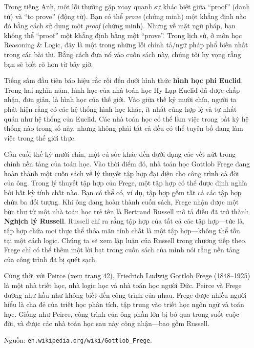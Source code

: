 \begin{warningbox}
Trong tiếng Anh, một lỗi thường gặp xoay quanh sự khác biệt giữa ``proof'' (danh từ) và ``to prove'' (động từ). Bạn có thể \emph{prove} (chứng minh) một khẳng định nào đó bằng cách sử dụng một \emph{proof} (chứng minh). Nhưng về mặt ngữ pháp, bạn không thể ``proof'' một khẳng định bằng một ``prove''. Trong lịch sử, ở môn học Reasoning \& Logic, đây là một trong những lỗi chính tả/ngữ pháp phổ biến nhất trong các bài thi. Bằng cách đưa nó vào cuốn sách này, chúng tôi hy vọng rằng bạn sẽ biết rõ hơn từ bây giờ.
\end{warningbox}

Tiếng sấm đầu tiên báo hiệu rắc rối đến dưới hình thức \textbf{hình học phi Euclid}. Trong hai nghìn năm, hình học của nhà toán học Hy Lạp Euclid đã được chấp nhận, đơn giản, là hình học của thế giới. Vào giữa thế kỷ mười chín, người ta phát hiện rằng có các hệ thống hình học khác, ít nhất cũng hợp lệ và tự nhất quán như hệ thống của Euclid. Các nhà toán học có thể làm việc trong bất kỳ hệ thống nào trong số này, nhưng không phải tất cả đều có thể tuyên bố đang làm việc trong thế giới thực.

Gần cuối thế kỷ mười chín, một cú sốc khác đến dưới dạng các vết nứt trong chính nền tảng của toán học. Vào thời điểm đó, nhà toán học Gottlob Frege đang hoàn thành một cuốn sách về lý thuyết tập hợp đại diện cho công trình cả đời của ông. Trong lý thuyết tập hợp của Frege, một tập hợp có thể được định nghĩa bởi bất kỳ tính chất nào. Bạn có thể có, ví dụ, tập hợp gồm tất cả các tập hợp chứa ba đối tượng. Khi ông đang hoàn thành cuốn sách, Frege nhận được một bức thư từ một nhà toán học trẻ tên là Bertrand Russell mô tả điều đã trở thành \textbf{Nghịch lý Russell}. Russell chỉ ra rằng tập hợp của tất cả các tập hợp---tức là, tập hợp chứa mọi thực thể thỏa mãn tính chất là một tập hợp---không thể tồn tại một cách logic. Chúng ta sẽ xem lập luận của Russell trong chương tiếp theo. Frege chỉ có thể thêm một lời bạt trong cuốn sách của mình nói rằng nền tảng của công trình đã bị quét sạch.

\begin{infobox}
Cùng thời với Peirce (xem trang 42), Friedrich Ludwig Gottlob Frege (1848--1925) là một nhà triết học, nhà logic học và nhà toán học người Đức. Peirce và Frege dường như hầu như không biết đến công trình của nhau. Frege được nhiều người hiểu là cha đẻ của triết học phân tích, tập trung vào triết học ngôn ngữ và toán học. Giống như Peirce, công trình của ông phần lớn bị bỏ qua trong suốt cuộc đời, và được các nhà toán học sau này công nhận---bao gồm Russell.

Nguồn: \texttt{en.wikipedia.org/wiki/Gottlob\_Frege}.
\end{infobox}

